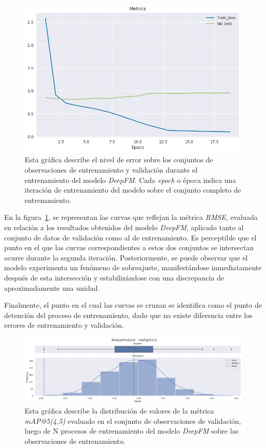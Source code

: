 \documentclass[11pt,a4paper,twoside]{thesis}
\begin{document}
\begin{figure}[h!]
	\centering
	\includegraphics[width=13cm]{./images/metrics-DeppFM-train-val-loss.png}
	\caption{
		Esta gráfica describe el nivel de error sobre los
		conjuntos de observaciones de entrenamiento y validación durante
		el entrenamiento del modelo \textit{DeepFM}. Cada \textit{epoch} o época
		indica una iteración de entrenamiento del modelo sobre el conjunto
		completo de entrenamiento.
	}
	\label{fig:deepFmLoss}
\end{figure}

En la figura~\ref{fig:deepFmLoss}, se representan las curvas que reflejan la
métrica \textit{RMSE}, evaluada en relación a los resultados obtenidos del
modelo \textit{DeepFM}, aplicado tanto al conjunto de datos de validación como
al de entrenamiento. Es perceptible que el punto en el que las curvas
correspondientes a estos dos conjuntos se intersectan ocurre durante la segunda
iteración. Posteriormente, se puede observar que el modelo experimenta un
fenómeno de sobreajuste, manifestándose inmediatamente después de esta
intersección y estabilizándose con una discrepancia de aproximadamente una
unidad.

Finalmente, el punto en el cual las curvas se cruzan se identifica como el
punto de detención del proceso de entrenamiento, dado que no existe diferencia
entre los errores de entrenamiento y validación.

\clearpage

\begin{figure}[h!]
	\centering
	\includegraphics[width=15cm]{./images/metrics-DeepFM-mapk.png}
	\caption{
		Esta gráfica describe la distribución de valores de la
		métrica \textit{mAP@5(4,5)} evaluado en el conjunto de
		observaciones de validación, luego de N procesos de
		entrenamiento del modelo \textit{DeepFM} sobre las observaciones
		de entrenamiento.
	}
	\label{fig:deepFmMAP}
\end{figure}
\end{document}
